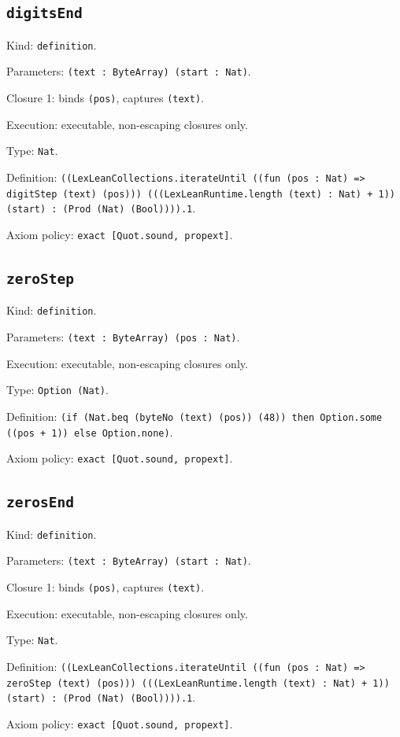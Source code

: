 \documentclass[11pt]{article}
\begin{document}
\subsection*{\texttt{digitsEnd}}
\noindent Kind: \texttt{definition}.\par
\noindent Parameters: \texttt{(text : ByteArray) (start : Nat)}.\par
\noindent Closure 1: binds \texttt{(pos)}, captures \texttt{(text)}.\par
\noindent Execution: executable, non-escaping closures only.\par
\noindent Type: \texttt{Nat}.\par
\noindent Definition: \texttt{((LexLeanCollections.iterateUntil ((fun (pos : Nat) => digitStep (text) (pos))) (((LexLeanRuntime.length (text) : Nat) + 1)) (start) : (Prod (Nat) (Bool)))).1}.\par
\noindent Axiom policy: \texttt{exact [Quot.sound, propext]}.\par
\subsection*{\texttt{zeroStep}}
\noindent Kind: \texttt{definition}.\par
\noindent Parameters: \texttt{(text : ByteArray) (pos : Nat)}.\par
\noindent Execution: executable, non-escaping closures only.\par
\noindent Type: \texttt{Option (Nat)}.\par
\noindent Definition: \texttt{(if (Nat.beq (byteNo (text) (pos)) (48)) then Option.some ((pos + 1)) else Option.none)}.\par
\noindent Axiom policy: \texttt{exact [Quot.sound, propext]}.\par
\subsection*{\texttt{zerosEnd}}
\noindent Kind: \texttt{definition}.\par
\noindent Parameters: \texttt{(text : ByteArray) (start : Nat)}.\par
\noindent Closure 1: binds \texttt{(pos)}, captures \texttt{(text)}.\par
\noindent Execution: executable, non-escaping closures only.\par
\noindent Type: \texttt{Nat}.\par
\noindent Definition: \texttt{((LexLeanCollections.iterateUntil ((fun (pos : Nat) => zeroStep (text) (pos))) (((LexLeanRuntime.length (text) : Nat) + 1)) (start) : (Prod (Nat) (Bool)))).1}.\par
\noindent Axiom policy: \texttt{exact [Quot.sound, propext]}.\par
\end{document}
